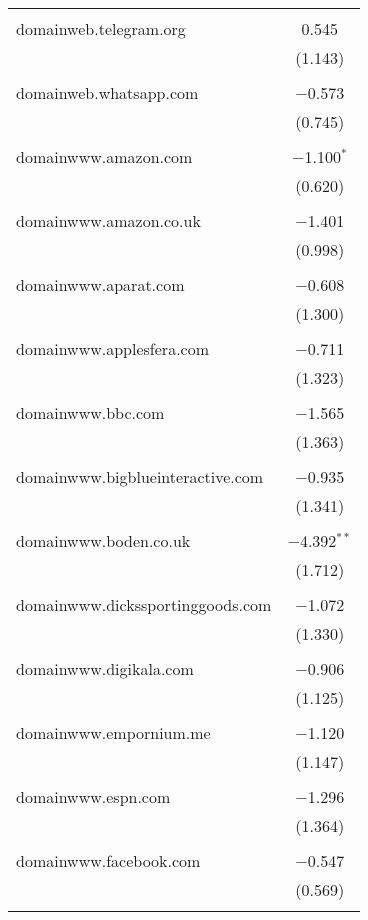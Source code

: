 \begin{table}[!htbp]
\begin{tabular}{@{\extracolsep{5pt}}lc}
  & \\ 
 domainweb.telegram.org & 0.545 \\ 
  & (1.143) \\ 
  & \\ 
 domainweb.whatsapp.com & $-$0.573 \\ 
  & (0.745) \\ 
  & \\ 
 domainwww.amazon.com & $-$1.100$^{*}$ \\ 
  & (0.620) \\ 
  & \\ 
 domainwww.amazon.co.uk & $-$1.401 \\ 
  & (0.998) \\ 
  & \\ 
 domainwww.aparat.com & $-$0.608 \\ 
  & (1.300) \\ 
  & \\ 
 domainwww.applesfera.com & $-$0.711 \\ 
  & (1.323) \\ 
  & \\ 
 domainwww.bbc.com & $-$1.565 \\ 
  & (1.363) \\ 
  & \\ 
 domainwww.bigblueinteractive.com & $-$0.935 \\ 
  & (1.341) \\ 
  & \\ 
 domainwww.boden.co.uk & $-$4.392$^{**}$ \\ 
  & (1.712) \\ 
  & \\ 
 domainwww.dickssportinggoods.com & $-$1.072 \\ 
  & (1.330) \\ 
  & \\ 
 domainwww.digikala.com & $-$0.906 \\ 
  & (1.125) \\ 
  & \\ 
 domainwww.empornium.me & $-$1.120 \\ 
  & (1.147) \\ 
  & \\ 
 domainwww.espn.com & $-$1.296 \\ 
  & (1.364) \\ 
  & \\ 
 domainwww.facebook.com & $-$0.547 \\ 
  & (0.569) \\ 
  & \\ 

\end{tabular}
\end{table}
